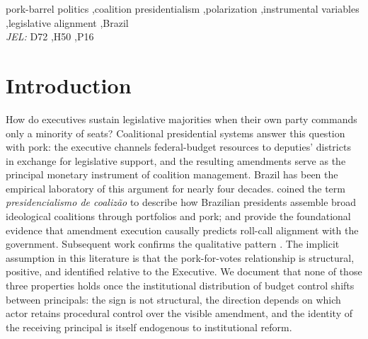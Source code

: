 \documentclass[preprint,12pt,authoryear]{elsarticle}
\begin{document}
\begin{frontmatter}
\begin{keyword}
pork-barrel politics \sep coalition presidentialism \sep polarization \sep instrumental variables \sep legislative alignment \sep Brazil
\\[2pt]
\textit{JEL:} D72 \sep H50 \sep P16
\end{keyword}

\end{frontmatter}

\section{Introduction}
\label{sec:intro}

How do executives sustain legislative majorities when their own party commands only a minority of seats? Coalitional presidential systems answer this question with pork: the executive channels federal-budget resources to deputies' districts in exchange for legislative support, and the resulting amendments serve as the principal monetary instrument of coalition management. Brazil has been the empirical laboratory of this argument for nearly four decades. \citet{Abranches1988} coined the term \emph{presidencialismo de coaliz\~ao} to describe how Brazilian presidents assemble broad ideological coalitions through portfolios and pork; \citet{PereiraAndMueller2004} and \citet{Raile2011} provide the foundational evidence that amendment execution causally predicts roll-call alignment with the government. Subsequent work confirms the qualitative pattern \citep{Zucco2009,Power2010,FigueiredoLimongi2000}. The implicit assumption in this literature is that the pork-for-votes relationship is structural, positive, and identified relative to the Executive. We document that none of those three properties holds once the institutional distribution of budget control shifts between principals: the sign is not structural, the direction depends on which actor retains procedural control over the visible amendment, and the identity of the receiving principal is itself endogenous to institutional reform.
\end{document}
